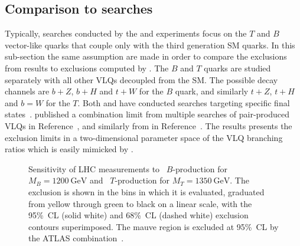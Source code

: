 \subsection{Comparison to \ATLAS searches}
Typically, searches conducted by the \ATLAS and \CMS experiments focus on the $T$ and $B$ vector-like quarks that couple only with the third generation SM quarks. In this sub-section the same assumption are made in order to compare the exclusions from \LHC results to exclusions computed by \contur. The $B$ and $T$ quarks are studied separately with all other VLQs decoupled from the SM. The possible decay channels are $b + Z$, $b + H$ and $t + W$ for the $B$ quark, and similarly $t + Z$, $t + H$ and $b = W$ for the $T$. Both \ATLAS and \CMS have conducted searches targeting specific final states~. \ATLAS published a combination limit from multiple searches of pair-produced VLQs in Reference~\cite{ATLAS_VLQ_combination}, and similarly from \CMS in Reference~\cite{Sirunyan_2018}. The \ATLAS results presents the exclusion limits in a two-dimensional parameter space of the VLQ branching ratios which is easily mimicked by \contur.
\begin{figure}[tbp]
    \vspace{-0.4cm}
    \caption{Sensitivity of LHC measurements to
    \protect{}~$B$-production for $M_B = \SI{1200}{\GeV}$ and
    \protect{}~$T$-production for $M_T = \SI{1350}{\GeV}$.
    The \contur exclusion is shown in the bins in which it is evaluated,
    graduated from yellow through green to black on a linear scale, with the 95\%~CL (solid white)
    and 68\%~CL (dashed white) exclusion contours superimposed. The mauve region
    is excluded at 95\%~CL by the ATLAS combination~\cite{Aaboud:2018pii}.}
    \label{fig:BTonly}
\end{figure}

